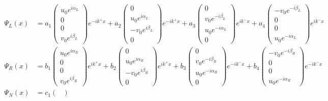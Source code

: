 \begin{equation}
\begin{split}
\Psi_L(x) &= 
a_1
\begin{pmatrix}
u_0e^{i\alpha_L} \\ 0 \\ 0 \\ v_0e^{i\beta_L}
\end{pmatrix}e^{-ik^+x}
+
a_2
\begin{pmatrix}
0 \\ u_0e^{i\alpha_L} \\ -v_0e^{i\beta_L} \\ 0
\end{pmatrix}e^{-ik^+x}
+
a_3
\begin{pmatrix}
0 \\ v_0e^{-i\beta_L} \\ u_0e^{-i\alpha_L} \\ 0
\end{pmatrix}e^{ik^-x}
+
a_4
\begin{pmatrix}
-v_0e^{-i\beta_L}\\ 0 \\ 0 \\ u_0e^{-i\alpha_L}
\end{pmatrix}e^{ik^-x}
\\
\Psi_R(x) &= 
b_1
\begin{pmatrix}
u_0e^{i\alpha_R} \\ 0 \\ 0 \\ v_0e^{i\beta_R}
\end{pmatrix}e^{ik^+x}
+
b_2
\begin{pmatrix}
0 \\ u_0e^{i\alpha_R} \\ -v_0e^{i\beta_R} \\ 0
\end{pmatrix}e^{ik^+x}
+
b_3
\begin{pmatrix}
0 \\ v_0e^{-i\beta_R} \\ u_0e^{-i\alpha_R} \\ 0
\end{pmatrix}e^{-ik^-x}
+
b_4
\begin{pmatrix}
-v_0e^{-i\beta_R}\\ 0 \\ 0 \\ u_0e^{-i\alpha_R}
\end{pmatrix}e^{-ik^-x}
\\
\Psi_N(x) &= 
c_1
\begin{pmatrix}

\end{pmatrix}
\end{split}
\end{equation}

